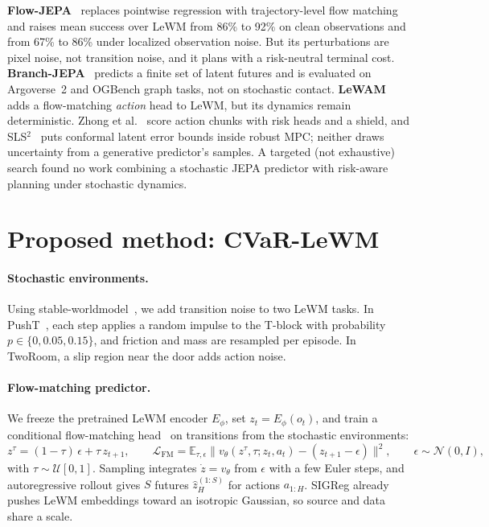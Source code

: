 \documentclass{article}
\newcommand{\E}{\mathbb{E}}
\begin{document}
\textbf{Flow-JEPA}~\cite{huo2026flowjepa} replaces pointwise regression with trajectory-level flow matching and raises mean success over LeWM from 86\% to 92\% on clean observations and from 67\% to 86\% under localized observation noise. But its perturbations are pixel noise, not transition noise, and it plans with a risk-neutral terminal cost. \textbf{Branch-JEPA}~\cite{song2026branchjepa} predicts a finite set of latent futures and is evaluated on Argoverse~2 and OGBench graph tasks, not on stochastic contact. \textbf{LeWAM}~\cite{fu2026lewam} adds a flow-matching \emph{action} head to LeWM, but its dynamics remain deterministic. Zhong et al.~\cite{zhong2026calibrated} score action chunks with risk heads and a shield, and SLS$^2$~\cite{nath2026sls2} puts conformal latent error bounds inside robust MPC; neither draws uncertainty from a generative predictor's samples. A targeted (not exhaustive) search found no work combining a stochastic JEPA predictor with risk-aware planning under stochastic dynamics.

\section{Proposed method: CVaR-LeWM}

\paragraph{Stochastic environments.} Using stable-worldmodel~\cite{maes2026swm}, we add transition noise to two LeWM tasks. In PushT~\cite{chi2023diffusionpolicy}, each step applies a random impulse to the T-block with probability $p\in\{0,0.05,0.15\}$, and friction and mass are resampled per episode. In TwoRoom, a slip region near the door adds action noise. 

\paragraph{Flow-matching predictor.} We freeze the pretrained LeWM encoder $E_\phi$, set $z_t=E_\phi(o_t)$, and train a conditional flow-matching head~\cite{lipman2023flow} on transitions from the stochastic environments:
\begin{equation}
z^\tau=(1-\tau)\,\epsilon+\tau\, z_{t+1},\qquad
\mathcal{L}_{\mathrm{FM}}=\E_{\tau,\epsilon}\big\|v_\theta(z^\tau,\tau;z_t,a_t)-(z_{t+1}-\epsilon)\big\|^2,\qquad \epsilon\sim\mathcal{N}(0,I),
\end{equation}
with $\tau\sim\mathcal{U}[0,1]$. Sampling integrates $\dot z=v_\theta$ from $\epsilon$ with a few Euler steps, and autoregressive rollout gives $S$ futures $\hat z^{(1:S)}_{H}$ for actions $a_{1:H}$. SIGReg already pushes LeWM embeddings toward an isotropic Gaussian, so source and data share a scale.
\end{document}
